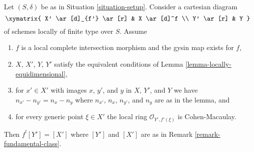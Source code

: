 \begin{lemma}
\label{lemma-lci-gysin-easy}
Let $(S, \delta)$ be as in Situation \ref{situation-setup}.
Consider a cartesian diagram
$$
\xymatrix{
X' \ar[d]_{f'} \ar[r] &
X \ar[d]^f \\
Y' \ar[r] &
Y
}
$$
of schemes locally of finite type over $S$. Assume
\begin{enumerate}
\item $f$ is a local complete intersection morphism and
the gysin map exists for $f$,
\item $X$, $X'$, $Y$, $Y'$ satisfy the equivalent conditions of
Lemma \ref{lemma-locally-equidimensional},
\item for $x' \in X'$ with images $x$, $y'$, and $y$
in $X$, $Y'$, and $Y$ we have $n_{x'} - n_{y'} = n_x - n_y$
where $n_{x'}$, $n_x$, $n_{y'}$, and $n_y$ are as in the lemma, and
\item for every generic point $\xi \in X'$ the local ring
$\mathcal{O}_{Y', f'(\xi)}$ is Cohen-Macaulay.
\end{enumerate}
Then $f^![Y'] = [X']$ where $[Y']$ and $[X']$ are as in
Remark \ref{remark-fundamental-class}.
\end{lemma}

